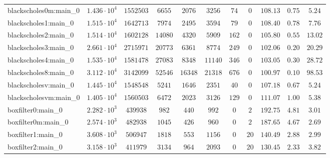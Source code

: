 \begin{tabular}{|l|c|c|c|c|c|c|c|c|c|c|}
blackscholes0m:main\_0         & $ 1.436 \cdot 10^{4} $ & $ 1552503  $ & $ 6655   $ & $ 2076   $ & $ 3256   $ & $ 74   $ & $ 0    $ & $ 108.13      $ & $ 0.75    $ & $ 5.24    $ \\
blackscholes1:main\_0          & $ 1.515 \cdot 10^{4} $ & $ 1642713  $ & $ 7974   $ & $ 2495   $ & $ 3594   $ & $ 79   $ & $ 0    $ & $ 108.40      $ & $ 0.78    $ & $ 7.76    $ \\
blackscholes2:main\_0          & $ 1.514 \cdot 10^{4} $ & $ 1602128  $ & $ 14080  $ & $ 4320   $ & $ 5909   $ & $ 162  $ & $ 0    $ & $ 105.80      $ & $ 0.55    $ & $ 13.02   $ \\
blackscholes3:main\_0          & $ 2.661 \cdot 10^{4} $ & $ 2715971  $ & $ 20773  $ & $ 6361   $ & $ 8774   $ & $ 249  $ & $ 0    $ & $ 102.06      $ & $ 0.20    $ & $ 20.29   $ \\
blackscholes4:main\_0          & $ 1.535 \cdot 10^{4} $ & $ 1581478  $ & $ 27083  $ & $ 8348   $ & $ 11140  $ & $ 346  $ & $ 0    $ & $ 103.05      $ & $ 0.30    $ & $ 28.72   $ \\
blackscholes8:main\_0          & $ 3.112 \cdot 10^{4} $ & $ 3142099  $ & $ 52546  $ & $ 16348  $ & $ 21318  $ & $ 676  $ & $ 0    $ & $ 100.97      $ & $ 0.10    $ & $ 98.53   $ \\
blackscholesv:main\_0          & $ 1.445 \cdot 10^{4} $ & $ 1548548  $ & $ 5241   $ & $ 1646   $ & $ 2351   $ & $ 40   $ & $ 0    $ & $ 107.18      $ & $ 0.67    $ & $ 5.24    $ \\
blackscholesvm:main\_0         & $ 1.405 \cdot 10^{4} $ & $ 1560503  $ & $ 6472   $ & $ 2023   $ & $ 3126   $ & $ 129  $ & $ 0    $ & $ 111.07      $ & $ 1.00    $ & $ 5.38    $ \\
boxfilter0:main\_0             & $ 2.282 \cdot 10^{3} $ & $ 439938   $ & $ 982    $ & $ 440    $ & $ 992    $ & $ 0    $ & $ 2    $ & $ 192.75      $ & $ 4.81    $ & $ 3.01    $ \\
boxfilter0m:main\_0            & $ 2.574 \cdot 10^{3} $ & $ 482938   $ & $ 1045   $ & $ 426    $ & $ 960    $ & $ 0    $ & $ 2    $ & $ 187.65      $ & $ 4.67    $ & $ 2.69    $ \\
boxfilter1:main\_0             & $ 3.608 \cdot 10^{3} $ & $ 506947   $ & $ 1818   $ & $ 553    $ & $ 1156   $ & $ 0    $ & $ 20   $ & $ 140.49      $ & $ 2.88    $ & $ 2.99    $ \\
boxfilter2:main\_0             & $ 3.158 \cdot 10^{3} $ & $ 411979   $ & $ 3134   $ & $ 964    $ & $ 2093   $ & $ 0    $ & $ 20   $ & $ 130.45      $ & $ 2.33    $ & $ 3.82    $ \\

\end{tabular}

